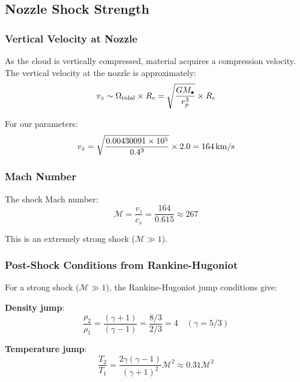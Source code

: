 \documentclass[twocolumn,amsmath,amssymb,prd,superscriptaddress,nofootinbib]{revtex4-2}
\begin{document}
\subsection{Nozzle Shock Strength}
\label{sec:shock_strength}

\subsubsection{Vertical Velocity at Nozzle}

As the cloud is vertically compressed, material acquires a compression velocity. The vertical velocity at the nozzle is approximately:
\begin{equation}
    v_z \sim \Omega_{\rm tidal} \times R_c = \sqrt{\frac{GM_\bullet}{r_p^3}} \times R_c
    \label{eq:v_z}
\end{equation}

For our parameters:
\begin{equation}
    v_z = \sqrt{\frac{0.00430091 \times 10^5}{0.4^3}} \times 2.0 = 164\,{\rm km/s}
\end{equation}

\subsubsection{Mach Number}

The shock Mach number:
\begin{equation}
    \mathcal{M} = \frac{v_z}{c_s} = \frac{164}{0.615} \approx \boxed{267}
    \label{eq:Mach}
\end{equation}

This is an extremely strong shock ($\mathcal{M} \gg 1$).

\subsubsection{Post-Shock Conditions from Rankine-Hugoniot}

For a strong shock ($\mathcal{M} \gg 1$), the Rankine-Hugoniot jump conditions give:

\textbf{Density jump}:
\begin{equation}
    \frac{\rho_2}{\rho_1} = \frac{(\gamma+1)}{(\gamma-1)} = \frac{8/3}{2/3} = 4 \quad (\gamma = 5/3)
    \label{eq:rho_jump}
\end{equation}

\textbf{Temperature jump}:
\begin{equation}
    \frac{T_2}{T_1} = \frac{2\gamma(\gamma-1)}{(\gamma+1)^2} \mathcal{M}^2 \approx 0.31 \mathcal{M}^2
    \label{eq:T_jump}
\end{equation}
\end{document}
